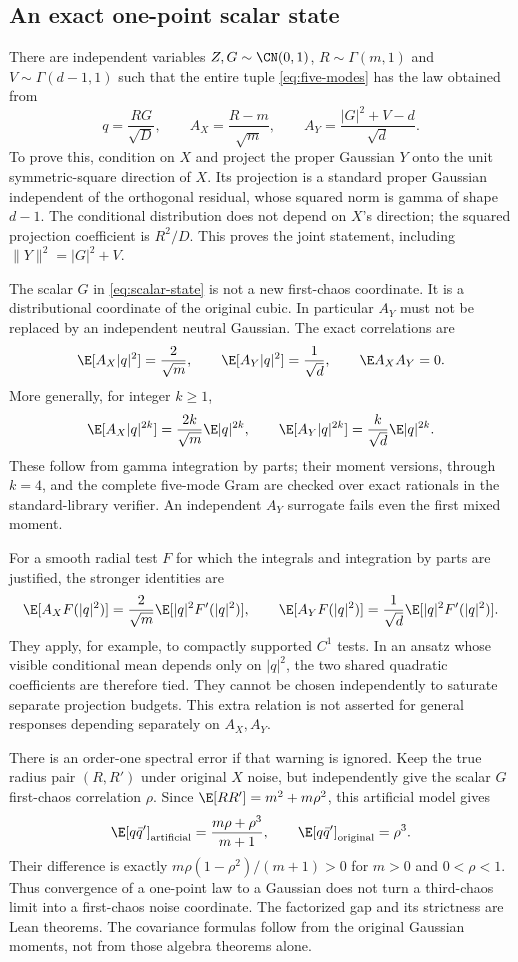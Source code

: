 \subsection{An exact one-point scalar state}
There are independent variables $Z,G\sim\CN(0,1)$,
$R\sim\Gamma(m,1)$ and $V\sim\Gamma(d-1,1)$ such that the entire tuple
\eqref{eq:five-modes} has the law obtained from
\begin{equation}\label{eq:scalar-state}
 q=\frac{RG}{\sqrt D},\qquad
 A_X=\frac{R-m}{\sqrt m},\qquad
 A_Y=\frac{|G|^2+V-d}{\sqrt d}.
\end{equation}
To prove this, condition on $X$ and project the proper Gaussian $Y$ onto the unit
symmetric-square direction of $X$. Its projection is a standard proper Gaussian
independent of the orthogonal residual, whose squared norm is gamma of shape
$d-1$. The conditional distribution does not depend on $X$'s direction; the
squared projection coefficient is $R^2/D$. This proves the joint statement,
including $\|Y\|^2=|G|^2+V$.

The scalar $G$ in \eqref{eq:scalar-state} is not a new first-chaos coordinate.
It is a distributional coordinate of the original cubic. In particular $A_Y$
must not be replaced by an independent neutral Gaussian. The exact correlations
are
\[
 \E[A_X|q|^2]=\frac2{\sqrt m},\qquad
 \E[A_Y|q|^2]=\frac1{\sqrt d},\qquad \E A_XA_Y=0.
\]
More generally, for integer $k\ge1$,
\[
 \E[A_X|q|^{2k}]=\frac{2k}{\sqrt m}\E|q|^{2k},\qquad
 \E[A_Y|q|^{2k}]=\frac{k}{\sqrt d}\E|q|^{2k}.
\]
These follow from gamma integration by parts; their moment versions, through
$k=4$, and the complete five-mode Gram are checked over exact rationals in the
standard-library verifier. An independent $A_Y$ surrogate fails even the first
mixed moment.

For a smooth radial test $F$ for which the integrals and integration by parts
are justified, the stronger identities are
\[
 \E[A_XF(|q|^2)]=\frac2{\sqrt m}\E[|q|^2F'(|q|^2)],\qquad
 \E[A_YF(|q|^2)]=\frac1{\sqrt d}\E[|q|^2F'(|q|^2)].
\]
They apply, for example, to compactly supported $C^1$ tests. In an ansatz whose
visible conditional mean depends only on $|q|^2$, the two shared quadratic
coefficients are therefore tied. They cannot be chosen independently to
saturate separate projection budgets. This extra relation is not asserted for
general responses depending separately on $A_X,A_Y$.

There is an order-one spectral error if that warning is ignored. Keep the true
radius pair $(R,R')$ under original $X$ noise, but independently give the scalar
$G$ first-chaos correlation $\rho$. Since
$\E[RR']=m^2+m\rho^2$, this artificial model gives
\[
 \E[q\bar q']_{\rm artificial}=\frac{m\rho+\rho^3}{m+1},\qquad
 \E[q\bar q']_{\rm original}=\rho^3.
\]
Their difference is exactly $m\rho(1-\rho^2)/(m+1)>0$ for
$m>0$ and $0<\rho<1$. Thus convergence of a one-point law to a Gaussian does
not turn a third-chaos limit into a first-chaos noise coordinate. The factorized
gap and its strictness are Lean theorems. The covariance formulas follow from
the original Gaussian moments, not from those algebra theorems alone.

